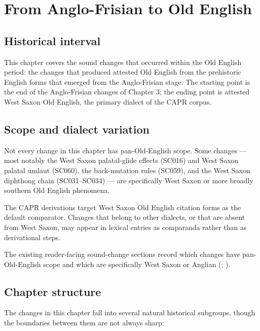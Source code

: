 \documentclass[
  british,
  a4paper,
  openany]{book}
\begin{document}
\newpage

\chapter{From Anglo-Frisian to Old
English}\label{from-anglo-frisian-to-old-english}

\section{Historical interval}\label{historical-interval-3}

This chapter covers the sound changes that occurred within the Old
English period: the changes that produced attested Old English from the
prehistoric English forms that emerged from the Anglo-Frisian stage. The
starting point is the end of the Anglo-Frisian changes of Chapter 3; the
ending point is attested West Saxon Old English, the primary dialect of
the CAPR corpus.

\section{Scope and dialect variation}\label{scope-and-dialect-variation}

Not every change in this chapter has pan-Old-English scope. Some changes
--- most notably the West Saxon palatal-glide effects (SC016) and West
Saxon palatal umlaut (SC060), the back-mutation rules (SC059), and the
West Saxon diphthong chain (SC031--SC034) --- are specifically West
Saxon or more broadly southern Old English phenomena.

The CAPR derivations target West Saxon Old English citation forms as the
default comparator. Changes that belong to other dialects, or that are
absent from West Saxon, may appear in lexical entries as comparanda
rather than as derivational steps.

The existing reader-facing sound-change sections record which changes
have pan-Old-English scope and which are specifically West Saxon or
Anglian (;
).

\section{Chapter structure}\label{chapter-structure}

The changes in this chapter fall into several natural historical
subgroups, though the boundaries between them are not always sharp:
\end{document}

